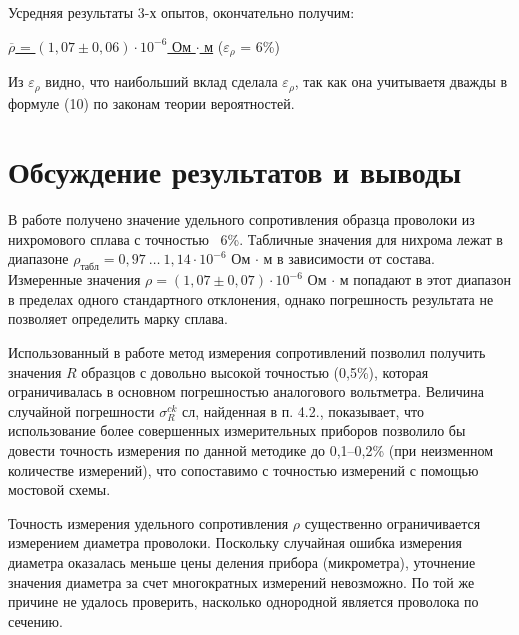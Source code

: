 \documentclass[12pt,a4paper]{article}
\begin{document}
Усредняя результаты 3-х опытов, окончательно получим:

{\centering \underline{$\overline{\rho}$ = $(1,07 \pm 0,06)\cdot 10^{-6}$ Ом $\cdot$ м} ($\varepsilon_{\rho}$ = 6\%)}

Из $\varepsilon_{\rho}$ видно, что наибольший вклад сделала $\varepsilon_{\rho}$, так как она учитываетя дважды в формуле (10) по законам теории вероятностей.
\newpage

\section{ Обсуждение результатов и выводы}
В работе получено значение удельного сопротивления образца проволоки из нихромового
сплава с точностью ~6\%. Табличные значения для нихрома лежат в диапазоне
$\rho_{табл} = 0,97~\ldots~1,14 \cdot 10^{-6}$ Ом $\cdot$ м  в зависимости от состава. Измеренные значения
$\rho = (1,07 \pm 0,07) \cdot 10^{-6}$ Ом $\cdot$ м попадают в этот диапазон в пределах одного стандартного отклонения, однако погрешность результата не позволяет определить марку сплава.

Использованный в работе метод измерения сопротивлений позволил получить значения $R$
образцов с довольно высокой точностью (0,5\%), которая ограничивалась в основном погрешностью аналогового вольтметра. Величина случайной погрешности $\sigma ^{ck} _{R}$
сл, найденная в п. 4.2., показывает, что использование более совершенных измерительных приборов позволило бы довести точность измерения по данной методике до 0,1–0,2\% (при неизменном количестве измерений), что сопоставимо с точностью измерений с помощью мостовой схемы.

Точность измерения удельного сопротивления $\rho$ существенно ограничивается измерением
диаметра проволоки. Поскольку случайная ошибка измерения диаметра оказалась меньше
цены деления прибора (микрометра), уточнение значения диаметра за счет многократных измерений невозможно. По той же причине не удалось проверить, насколько однородной является проволока по сечению.
\end{document}

